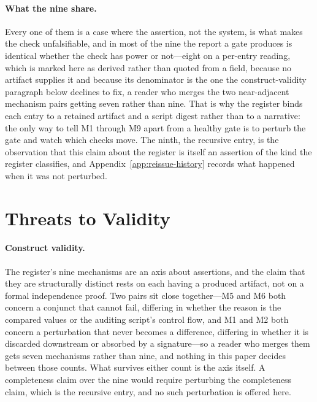 \documentclass[11pt]{article}
\begin{document}
\paragraph{What the nine share.} Every one of them is a case where the assertion, not the system, is what makes the check unfalsifiable, and in most of the nine the report a gate produces is identical whether the check has power or not---eight on a per-entry reading, which is marked here as derived rather than quoted from a field, because no artifact supplies it and because its denominator is the one the construct-validity paragraph below declines to fix, a reader who merges the two near-adjacent mechanism pairs getting seven rather than nine. That is why the register binds each entry to a retained artifact and a script digest rather than to a narrative: the only way to tell M1 through M9 apart from a healthy gate is to perturb the gate and watch which checks move. The ninth, the recursive entry, is the observation that this claim about the register is itself an assertion of the kind the register classifies, and Appendix~\ref{app:reissue-history} records what happened when it was not perturbed.

\section*{Threats to Validity}
\paragraph{Construct validity.} The register's nine mechanisms are an axis about assertions, and the claim that they are structurally distinct rests on each having a produced artifact, not on a formal independence proof. Two pairs sit close together---M5 and M6 both concern a conjunct that cannot fail, differing in whether the reason is the compared values or the auditing script's control flow, and M1 and M2 both concern a perturbation that never becomes a difference, differing in whether it is discarded downstream or absorbed by a signature---so a reader who merges them gets seven mechanisms rather than nine, and nothing in this paper decides between those counts. What survives either count is the axis itself. A completeness claim over the nine would require perturbing the completeness claim, which is the recursive entry, and no such perturbation is offered here.
\end{document}
